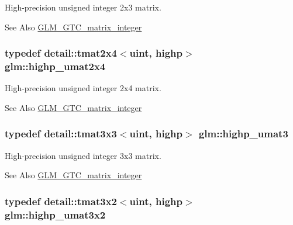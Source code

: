 High-\/precision unsigned integer 2x3 matrix. \begin{DoxySeeAlso}{See Also}
\hyperlink{group__gtc__matrix__integer}{G\-L\-M\-\_\-\-G\-T\-C\-\_\-matrix\-\_\-integer} 
\end{DoxySeeAlso}
\hypertarget{group__gtc__matrix__integer_gabe8572c228aecc0bfa7ba92415b1c651}{
\subsubsection[{highp\-\_\-umat2x4}]{\setlength{\rightskip}{0pt plus 5cm}typedef detail\-::tmat2x4$<$uint, highp$>$ {\bf glm\-::highp\-\_\-umat2x4}}}\label{group__gtc__matrix__integer_gabe8572c228aecc0bfa7ba92415b1c651}
High-\/precision unsigned integer 2x4 matrix. \begin{DoxySeeAlso}{See Also}
\hyperlink{group__gtc__matrix__integer}{G\-L\-M\-\_\-\-G\-T\-C\-\_\-matrix\-\_\-integer} 
\end{DoxySeeAlso}
\hypertarget{group__gtc__matrix__integer_ga2a271939d0123103f088e325e5123385}{
\subsubsection[{highp\-\_\-umat3}]{\setlength{\rightskip}{0pt plus 5cm}typedef detail\-::tmat3x3$<$uint, highp$>$ {\bf glm\-::highp\-\_\-umat3}}}\label{group__gtc__matrix__integer_ga2a271939d0123103f088e325e5123385}
High-\/precision unsigned integer 3x3 matrix. \begin{DoxySeeAlso}{See Also}
\hyperlink{group__gtc__matrix__integer}{G\-L\-M\-\_\-\-G\-T\-C\-\_\-matrix\-\_\-integer} 
\end{DoxySeeAlso}
\hypertarget{group__gtc__matrix__integer_ga6f6a73ec605a515fb21d779663082ef9}{
\subsubsection[{highp\-\_\-umat3x2}]{\setlength{\rightskip}{0pt plus 5cm}typedef detail\-::tmat3x2$<$uint, highp$>$ {\bf glm\-::highp\-\_\-umat3x2}}}\label{group__gtc__matrix__integer_ga6f6a73ec605a515fb21d779663082ef9}

